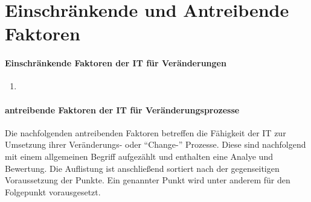 \section{Einschränkende und Antreibende Faktoren}
\label{section:faktoren-change}

\paragraph{Einschränkende Faktoren der IT für Veränderungen}
\begin{enumerate}
    \item 
\end{enumerate}

\paragraph{antreibende Faktoren der IT für Veränderungsprozesse}
Die nachfolgenden antreibenden Faktoren betreffen die Fähigkeit der IT zur Umsetzung ihrer Veränderungs- oder \enquote{Change-} Prozesse. Diese sind nachfolgend mit einem allgemeinen Begriff aufgezählt und enthalten eine Analye und Bewertung. Die Auflistung ist anschließend sortiert nach der gegenseitigen Voraussetzung der Punkte. Ein genannter Punkt wird unter anderem für den Folgepunkt vorausgesetzt.

